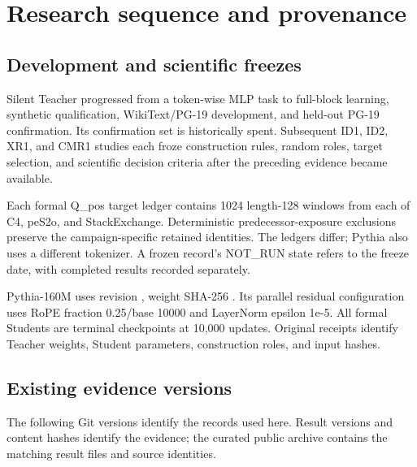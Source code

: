 \section{Research sequence and provenance}\label{research-sequence-and-provenance}

\subsection{Development and scientific freezes}\label{development-and-scientific-freezes}

Silent Teacher progressed from a token-wise MLP task to full-block learning, synthetic qualification, WikiText/PG-19 development, and held-out PG-19 confirmation. Its confirmation set is historically spent. Subsequent ID1, ID2, XR1, and CMR1 studies each froze construction rules, random roles, target selection, and scientific decision criteria after the preceding evidence became available.

Each formal Q\_pos target ledger contains 1024 length-128 windows from each of C4, peS2o, and StackExchange. Deterministic predecessor-exposure exclusions preserve the campaign-specific retained identities. The ledgers differ; Pythia also uses a different tokenizer. A frozen record's NOT\_RUN state refers to the freeze date, with completed results recorded separately.

Pythia-160M uses revision \texttt{}, weight SHA-256 \texttt{}. Its parallel residual configuration uses RoPE fraction 0.25/base 10000 and LayerNorm epsilon 1e-5. All formal Students are terminal checkpoints at 10,000 updates. Original receipts identify Teacher weights, Student parameters, construction roles, and input hashes.

\subsection{Existing evidence versions}\label{existing-evidence-versions}

The following Git versions identify the records used here. Result versions and content hashes identify the evidence; the curated public archive contains the matching result files and source identities.

